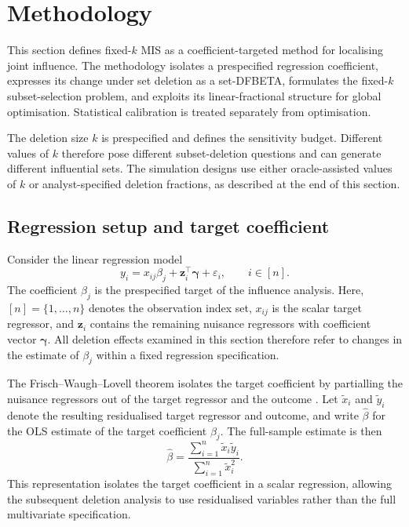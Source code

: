 \documentclass[../main.tex]{subfiles}
\begin{document}
\section{Methodology}
\label{sec:methodology}

This section defines fixed-\(k\) MIS as a coefficient-targeted method for localising joint influence. The methodology isolates a prespecified regression coefficient, expresses its change under set deletion as a set-DFBETA, formulates the fixed-\(k\) subset-selection problem, and exploits its linear-fractional structure for global optimisation. Statistical calibration is treated separately from optimisation.

The deletion size \(k\) is prespecified and defines the sensitivity budget. Different values of \(k\) therefore pose different subset-deletion questions and can generate different influential sets. The simulation designs use either oracle-assisted values of \(k\) or analyst-specified deletion fractions, as described at the end of this section.

\subsection{Regression setup and target coefficient}
\label{subsec:regression_setup}

Consider the linear regression model
\begin{equation}
y_i
=
x_{ij}\beta_j
+
\mathbf{z}_i^{\top}\boldsymbol{\gamma}
+
\varepsilon_i,
\qquad i\in[n].
\label{eq:regression_target}
\end{equation}
The coefficient $\beta_j$ is the prespecified target of the influence analysis. Here, $[n]=\{1,\ldots,n\}$ denotes the observation index set, $x_{ij}$ is the scalar target regressor, and $\mathbf{z}_i$ contains the remaining nuisance regressors with coefficient vector $\boldsymbol{\gamma}$. All deletion effects examined in this section therefore refer to changes in the estimate of $\beta_j$ within a fixed regression specification.

The Frisch--Waugh--Lovell theorem isolates the target coefficient by partialling the nuisance regressors out of the target regressor and the outcome \parencite{frisch1933partial,lovell1963seasonal}. Let $\widetilde{x}_i$ and $\widetilde{y}_i$ denote the resulting residualised target regressor and outcome, and write $\widehat{\beta}$ for the OLS estimate of the target coefficient $\beta_j$. The full-sample estimate is then
\begin{equation}
\widehat{\beta}
=
\frac{\sum_{i=1}^{n}\widetilde{x}_i\widetilde{y}_i}
{\sum_{i=1}^{n}\widetilde{x}_i^2}.
\label{eq:target_beta_residualised}
\end{equation}
This representation isolates the target coefficient in a scalar regression, allowing the subsequent deletion analysis to use residualised variables rather than the full multivariate specification. 
\end{document}

